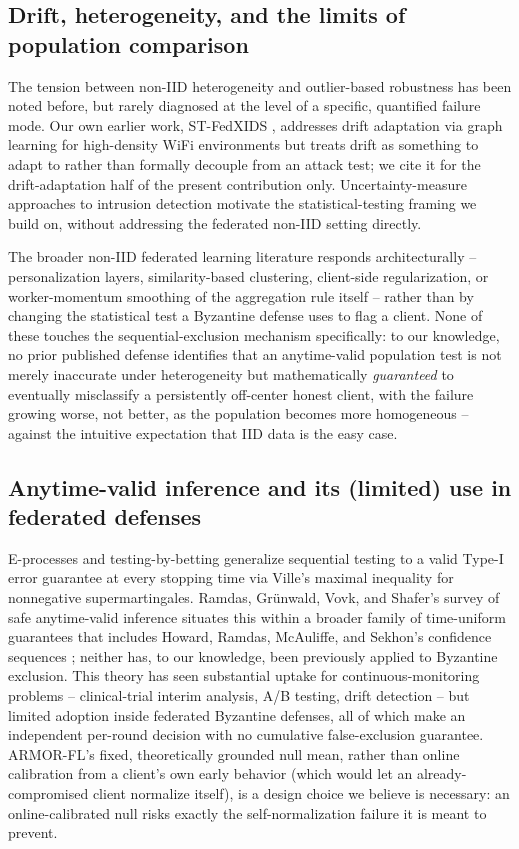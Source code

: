 \documentclass[pdflatex,iicol,sn-mathphys-num]{sn-jnl}%
\theoremstyle{thmstyleone}%
\theoremstyle{thmstyletwo}%
\theoremstyle{thmstylethree}%
\begin{document}
\subsection{Drift, heterogeneity, and the limits of population comparison}

The tension between non-IID heterogeneity and outlier-based robustness has been noted before, but rarely diagnosed at the level of a specific, quantified failure mode. Our own earlier work, ST-FedXIDS \citep{dang2026stfedxids}, addresses drift adaptation via graph learning for high-density WiFi environments but treats drift as something to adapt to rather than formally decouple from an attack test; we cite it for the drift-adaptation half of the present contribution only. Uncertainty-measure approaches to intrusion detection \citep{dang2026uncertainty} motivate the statistical-testing framing we build on, without addressing the federated non-IID setting directly.

The broader non-IID federated learning literature responds architecturally -- personalization layers, similarity-based clustering, client-side regularization, or worker-momentum smoothing of the aggregation rule itself \citep{karimireddy2021learning} -- rather than by changing the statistical test a Byzantine defense uses to flag a client. None of these touches the sequential-exclusion mechanism specifically: to our knowledge, no prior published defense identifies that an anytime-valid population test is not merely inaccurate under heterogeneity but mathematically \emph{guaranteed} to eventually misclassify a persistently off-center honest client, with the failure growing worse, not better, as the population becomes more homogeneous -- against the intuitive expectation that IID data is the easy case.

\subsection{Anytime-valid inference and its (limited) use in federated defenses}

E-processes and testing-by-betting \citep{waudbysmith2020betting} generalize sequential testing to a valid Type-I error guarantee at every stopping time via Ville's maximal inequality for nonnegative supermartingales. Ramdas, Gr\"unwald, Vovk, and Shafer's survey of safe anytime-valid inference \citep{ramdas2023savi} situates this within a broader family of time-uniform guarantees that includes Howard, Ramdas, McAuliffe, and Sekhon's confidence sequences \citep{howard2021timeuniform}; neither has, to our knowledge, been previously applied to Byzantine exclusion. This theory has seen substantial uptake for continuous-monitoring problems -- clinical-trial interim analysis, A/B testing, drift detection -- but limited adoption inside federated Byzantine defenses, all of which make an independent per-round decision with no cumulative false-exclusion guarantee. ARMOR-FL's fixed, theoretically grounded null mean, rather than online calibration from a client's own early behavior (which would let an already-compromised client normalize itself), is a design choice we believe is necessary: an online-calibrated null risks exactly the self-normalization failure it is meant to prevent.
\end{document}
